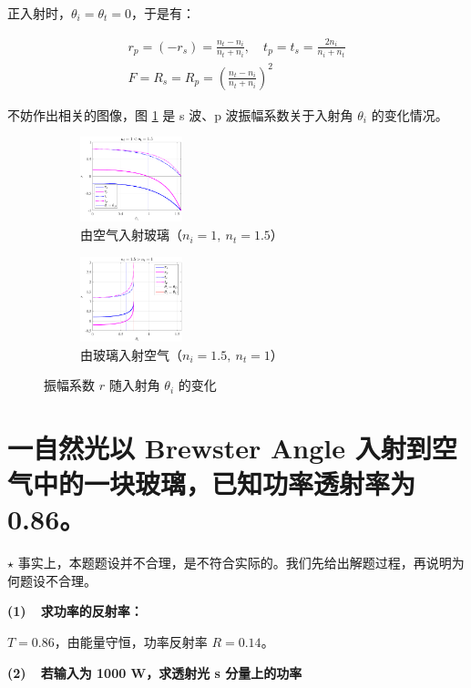 \documentclass[a4paper]{article}  %
\theoremstyle{MyLineTheoremStyle} %
\theoremstyle{MyBlockTheoremStyle} %
\theoremstyle{MySubsubsectionStyle} %
\begin{document}
\begin{multicols*}{4}
正入射时，$\theta_i = \theta_t = 0$，于是有：

\begin{gather}
    r_p = (-r_s)  = \frac{n_t - n_i}{n_t + n_i},\quad t_p = t_s = \frac{2n_i}{n_i + n_t} \\ 
    F = R_s = R_p = \left( \frac{n_t - n_i}{n_t + n_i} \right)^2
\end{gather}


不妨作出相关的图像，图 \ref{振幅系数随入射角的变化} 是 s 波、p 波振幅系数关于入射角 $\theta_i$ 的变化情况。

\begin{figure}[H]\centering
\begin{subfigure}[t]{0.49\columnwidth}\centering
    \includegraphics[height=70pt]{assets/2024-09-15_10-53-31.pdf}
    \caption{ 由空气入射玻璃（$n_i = 1,\ n_t = 1.5$） }
\end{subfigure}
\begin{subfigure}[t]{0.49\columnwidth}\centering
    \includegraphics[height=70pt]{assets/2024-09-15_10-53-27.pdf}
    \caption{ 由玻璃入射空气（$n_i = 1.5,\ n_t = 1$） }
\end{subfigure}
\caption{ 振幅系数 $r$ 随入射角 $\theta_i$ 的变化 }\label{振幅系数随入射角的变化}
\end{figure}


\section{一自然光以 Brewster Angle 入射到空气中的一块玻璃，已知功率透射率为 0.86。}

{\color{red} $\star $ 事实上，本题题设并不合理，是不符合实际的。我们先给出解题过程，再说明为何题设不合理。}

\textbf{(1)\ \ 求功率的反射率：}

$T = 0.86$，由能量守恒，功率反射率 $R = 0.14$。

\textbf{(2)\ \ 若输入为 1000 W，求透射光 s 分量上的功率}


\end{multicols*}
\end{document}
